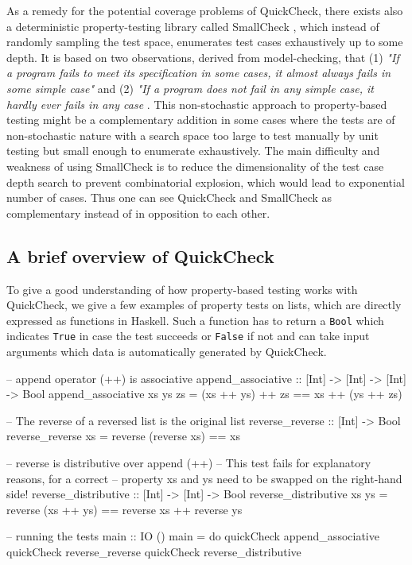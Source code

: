 \medskip

As a remedy for the potential coverage problems of QuickCheck, there exists also a deterministic property-testing library called SmallCheck \cite{runciman_smallcheck_2008}, which instead of randomly sampling the test space, enumerates test cases exhaustively up to some depth. It is based on two observations, derived from model-checking, that (1) \textit{"If a program fails to meet its specification in some cases, it almost always fails in some simple case"} and (2) \textit{"If a program does not fail in any simple case, it hardly ever fails in any case} \cite{runciman_smallcheck_2008}. This non-stochastic approach to property-based testing might be a complementary addition in some cases where the tests are of non-stochastic nature with a search space too large to test manually by unit testing but small enough to enumerate exhaustively. The main difficulty and weakness of using SmallCheck is to reduce the dimensionality of the test case depth search to prevent combinatorial explosion, which would lead to exponential number of cases. Thus one can see QuickCheck and SmallCheck as complementary instead of in opposition to each other.

\subsection*{A brief overview of QuickCheck}
To give a good understanding of how property-based testing works with \\ QuickCheck, we give a few examples of property tests on lists, which are directly expressed as functions in Haskell. Such a function has to return a \texttt{Bool} which indicates \texttt{True} in case the test succeeds or \texttt{False} if not and can take input arguments which data is automatically generated by QuickCheck.

\begin{HaskellCode}
-- append operator (++) is associative
append_associative :: [Int] -> [Int] -> [Int] -> Bool
append_associative xs ys zs = (xs ++ ys) ++ zs == xs ++ (ys ++ zs)

-- The reverse of a reversed list is the original list
reverse_reverse :: [Int] -> Bool
reverse_reverse xs = reverse (reverse xs) == xs

-- reverse is distributive over append (++)
-- This test fails for explanatory reasons, for a correct 
-- property xs and ys need to be swapped on the right-hand side!
reverse_distributive :: [Int] -> [Int] -> Bool
reverse_distributive xs ys = reverse (xs ++ ys) == reverse xs ++ reverse ys

-- running the tests
main :: IO ()
main = do
  quickCheck append_associative
  quickCheck reverse_reverse
  quickCheck reverse_distributive
\end{HaskellCode}

